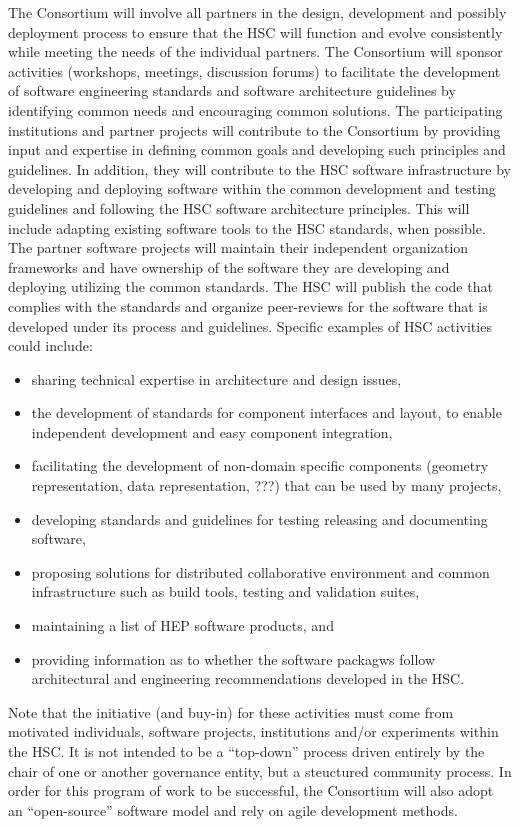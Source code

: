 \documentclass[12pt,letterpaper,fleqn]{article}
\begin{document}
The Consortium will involve all partners in the design, development
and possibly deployment process to ensure that the HSC will function
and evolve consistently while meeting the needs of the individual
partners.  The Consortium will sponsor activities (workshops,
meetings, discussion forums) to facilitate the development of
software engineering standards and software architecture guidelines
by identifying common needs and encouraging common solutions. The
participating institutions and partner projects will contribute to
the Consortium by providing input and expertise in defining common
goals and developing such principles and guidelines.  In addition,
they will contribute to the HSC software infrastructure by developing
and deploying software within the common development and testing
guidelines and following the HSC software architecture principles.
This will include adapting existing software tools to the HSC
standards, when possible.  The partner software projects will
maintain their
independent organization frameworks and have ownership of the
software they are developing and deploying utilizing the common
standards.  The HSC will publish the code that complies with the
standards and organize peer-reviews for the software that is developed
under its process and guidelines.  Specific examples of HSC activities
could include:
\begin{itemize}
\item sharing technical expertise in architecture and design issues,
\item the development of standards for component interfaces and layout, to
enable independent development and easy component integration,
\item facilitating the development of non-domain specific components
(geometry representation, data representation, ???) that can be used
by many projects,
\item developing standards and guidelines for testing releasing and
documenting software,
\item proposing solutions for distributed collaborative environment
and common infrastructure such as build tools, testing and validation
suites,
\item maintaining a list of HEP software products, and
\item providing information as to whether the software packagws follow
architectural and engineering recommendations developed in the HSC.
\end{itemize}

Note that the initiative (and buy-in) for these activities
must come from motivated
individuals, software projects, institutions and/or experiments within
the HSC. It is not intended to be a ``top-down'' process driven
entirely by the chair of one or another governance entity, but
a steuctured community process. In order for this program of work
to be successful, the Consortium will also adopt an ``open-source''
software model and rely on agile development methods.  
\end{document}
